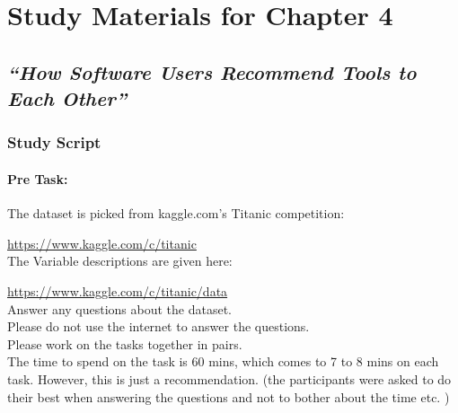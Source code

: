 \renewcommand*{\thefootnote}{\fnsymbol{footnote}}
\setcounter{footnote}{0}
\chapter{Study Materials for Chapter 4}
\label{app-prelim}

%

\section{\em ``How Software Users Recommend Tools to Each Other''}
\label{app-peer}



\subsection{Study Script}
\label{app-peer-tasks}

\subsubsection*{\large Pre Task:} 

The dataset is picked from kaggle.com’s Titanic competition: 

\url{https://www.kaggle.com/c/titanic} \\

\noindent
The Variable descriptions are given here: 

\url{https://www.kaggle.com/c/titanic/data} \\

\noindent
Answer any questions about the dataset. \\

\noindent
Please do not use the internet to answer the questions. \\

\noindent
Please work on the tasks together in pairs.   \\

\noindent
The time to spend on the task is 60 mins, which comes to 7 to 8 mins on each task. However, this is just a recommendation. 
(the participants were asked to do their best when answering the questions and not to bother about the time etc. ) \\

